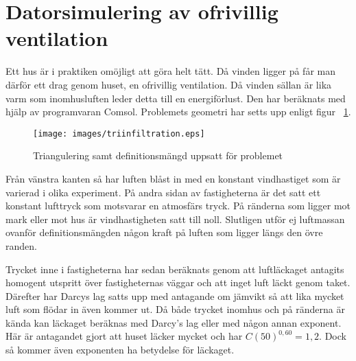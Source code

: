 \section{Datorsimulering av ofrivillig ventilation}

Ett hus är i praktiken omöjligt att göra helt tätt. Då vinden ligger på
får man därför ett drag genom huset, en ofrivillig ventilation. Då vinden
sällan är lika varm som inomhusluften leder detta till en energiförlust.
Den har beräknats med hjälp av programvaran Comsol. Problemets geometri har
setts upp enligt figur~ \ref{fig:windmethod:tri}.


\begin{figure}
\centering
\texttt{[image: images/triinfiltration.eps]}
\caption{Triangulering samt definitionsmängd uppsatt för problemet}\label{fig:windmethod:tri}
\end{figure}

Från vänstra kanten så har luften blåst in med en konstant vindhastiget som är varierad i olika
experiment. På andra sidan av fastigheterna är det satt ett konstant lufttryck som motsvarar en
atmosfärs tryck. På ränderna som ligger mot mark eller mot hus är vindhastigheten satt till noll.
Slutligen utför ej luftmassan ovanför definitionsmängden någon kraft på luften som ligger längs den
övre randen.

Trycket inne i fastigheterna har sedan beräknats genom att luftläckaget antagits homogent utspritt över fastigheternas
väggar och att inget luft läckt genom taket. Därefter har Darcys lag satts upp med antagande om jämvikt så att lika mycket
luft som flödar in även kommer ut. Då både trycket inomhus och på ränderna är kända kan läckaget beräknas med Darcy's lag
eller med någon annan exponent. Här är antagandet gjort att huset läcker mycket och har $C(50)^{0,60} = 1,2$. Dock
så kommer även exponenten ha betydelse för läckaget.\cite{sasic}

